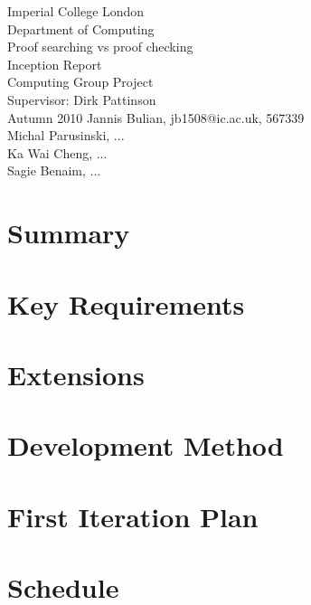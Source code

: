 \documentclass[12pt,a4paper]{scrartcl}
\begin{document}
\thispagestyle{empty}
\begin{titlepage}
  \begin{center}
    \vspace*{\fill}
            {{\Large Imperial College London\\ Department of Computing\\}}
            \vfill {{\Huge Proof searching vs proof checking \\
                     Inception Report}}\\
            \vfill {{\large Computing Group Project\\ 
                Supervisor: Dirk Pattinson\\ Autumn 2010}}
            \vfill {Jannis Bulian, jb1508@ic.ac.uk, 567339 \\
                    Michal Parusinski, ... \\
                    Ka Wai Cheng, ... \\
                    Sagie Benaim, ...}
  \end{center}
\end{titlepage}

\newpage

\tableofcontents
\thispagestyle{empty}

\newpage

\section{Summary}


\section{Key Requirements}


\section{Extensions}


\section{Development Method}


\section{First Iteration Plan}


\section{Schedule}

\end{document}
